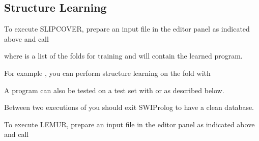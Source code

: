 \documentclass[letterpaper,10pt,english]{sphinxmanual}
\begin{document}
\subsection{Structure Learning}
\label{\detokenize{index:structure-learning}}
\sphinxAtStartPar
To execute SLIPCOVER, prepare an input file in the editor panel as indicated above and call

\begin{sphinxVerbatim}[commandchars=\\\{\}]
  
\end{sphinxVerbatim}

\sphinxAtStartPar
where  is a list of the folds for training and  will contain the learned program.

\sphinxAtStartPar
For example , you can perform structure learning on the  fold with

\begin{sphinxVerbatim}[commandchars=\\\{\}]
 \PYG{p}{[}\PYG{p}{]}
\end{sphinxVerbatim}

\sphinxAtStartPar
A program can also be tested on a test set with  or  as described below.

\sphinxAtStartPar
Between two executions of  you should exit SWI\sphinxhyphen{}Prolog to have a clean database.

\sphinxAtStartPar
To execute LEMUR, prepare an input file in the editor panel as indicated above and call

\begin{sphinxVerbatim}[commandchars=\\\{\}]
  
\end{sphinxVerbatim}
\end{document}
